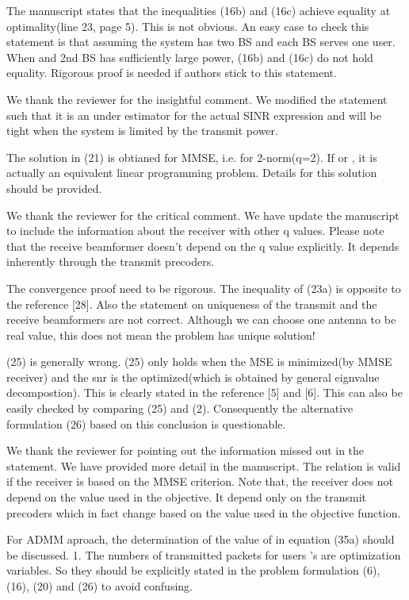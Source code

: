  The manuscript states that the inequalities (16b) and (16c) achieve equality at optimality(line 23, page 5). This is not obvious. An easy case to check this statement is that assuming the system has two BS and each BS serves one user. When  and 2nd BS has sufficiently large power, (16b) and (16c) do not hold equality. Rigorous proof is needed if authors stick to this statement.

\resp We thank the reviewer for the insightful comment. We modified the statement such that it is an under estimator for the actual SINR expression and will be tight when the system is limited by the transmit power.

 The solution in (21) is obtianed for MMSE, i.e. for 2-norm(q=2). If  or , it is actually an equivalent linear programming problem. Details for this solution should be provided.

\resp We thank the reviewer for the critical comment. We have update the manuscript to include the information about the receiver with other q values. Please note that the receive beamformer doesn't depend on the q value explicitly. It depends inherently through the transmit precoders.

 The convergence proof need to be rigorous. The inequality of (23a) is opposite to the reference [28]. Also the statement on uniqueness of the transmit and the receive beamformers are not correct. Although we can choose one antenna to be real value, this does not mean the problem has unique solution!

 (25) is generally wrong. (25) only holds when the MSE is minimized(by MMSE receiver) and the snr is the optimized(which is obtained by general eignvalue decompostion). This is clearly stated in the reference [5] and [6]. This can also be easily checked by comparing (25) and (2). Consequently the alternative formulation (26) based on this conclusion is questionable.

\resp We thank the reviewer for pointing out the information missed out in the statement. We have provided more detail in the manuscript. The relation is valid if the receiver is based on the MMSE criterion. Note that, the receiver does not depend on the  value used in the objective. It depend only on the transmit precoders which in fact change based on the  value used in the objective function. 

 For ADMM aproach, the determination of the value of \me{\rho} in equation (35a) should be discussed. 1. The numbers of transmitted packets for users  's are optimization variables. So they should be explicitly stated in the problem formulation (6), (16), (20) and (26) to avoid confusing.

